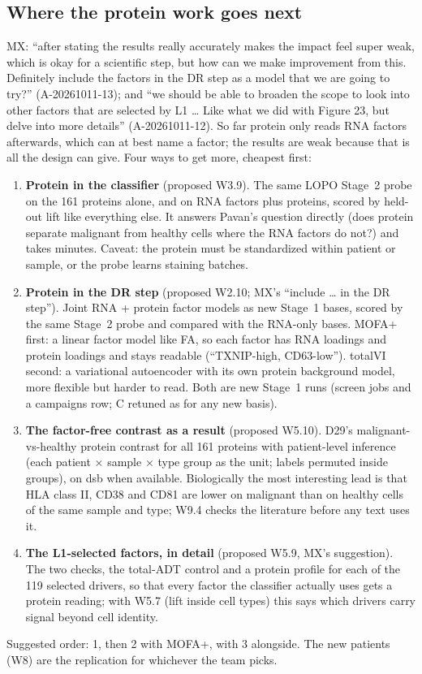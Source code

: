 \subsection*{Where the protein work goes next}
MX: ``after stating the results really accurately makes the impact feel super weak, which is okay for a scientific step, but how can we make improvement from this. Definitely include the factors in the DR step as a model that we are going to try?'' (A-20261011-13); and ``we should be able to broaden the scope to look into other factors that are selected by L1 \ldots{} Like what we did with Figure 23, but delve into more details'' (A-20261011-12). So far protein only reads RNA factors afterwards, which can at best name a factor; the results are weak because that is all the design can give. Four ways to get more, cheapest first:
\begin{enumerate}[leftmargin=*,itemsep=1pt,topsep=1pt]
\item \textbf{Protein in the classifier} (proposed W3.9). The same LOPO Stage~2 probe on the 161 proteins alone, and on RNA factors plus proteins, scored by held-out lift like everything else. It answers Pavan's question directly (does protein separate malignant from healthy cells where the RNA factors do not?) and takes minutes. Caveat: the protein must be standardized within patient or sample, or the probe learns staining batches.
\item \textbf{Protein in the DR step} (proposed W2.10; MX's ``include \ldots{} in the DR step''). Joint RNA + protein factor models as new Stage~1 bases, scored by the same Stage~2 probe and compared with the RNA-only bases. MOFA+ first: a linear factor model like FA, so each factor has RNA loadings and protein loadings and stays readable (``TXNIP-high, CD63-low''). totalVI second: a variational autoencoder with its own protein background model, more flexible but harder to read. Both are new Stage~1 runs (screen jobs and a campaigns row; C retuned as for any new basis).
\item \textbf{The factor-free contrast as a result} (proposed W5.10). D29's malignant-vs-healthy protein contrast for all 161 proteins with patient-level inference (each patient $\times$ sample $\times$ type group as the unit; labels permuted inside groups), on dsb when available. Biologically the most interesting lead is that HLA class II, CD38 and CD81 are lower on malignant than on healthy cells of the same sample and type; W9.4 checks the literature before any text uses it.
\item \textbf{The L1-selected factors, in detail} (proposed W5.9, MX's suggestion). The two checks, the total-ADT control and a protein profile for each of the 119 selected drivers, so that every factor the classifier actually uses gets a protein reading; with W5.7 (lift inside cell types) this says which drivers carry signal beyond cell identity.
\end{enumerate}
Suggested order: 1, then 2 with MOFA+, with 3 alongside. The new patients (W8) are the replication for whichever the team picks.

